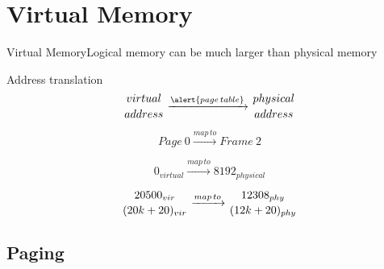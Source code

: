 \section{Virtual Memory}

\begin{frame}{Virtual Memory}{Logical memory can be much larger than physical memory}
  \begin{minipage}{.4\textwidth}
  \end{minipage}\hfill
  \begin{minipage}{.48\textwidth}
    \begin{iblock}{Address translation}
      $$\genfrac{}{}{0pt}{}{virtual}{address}
      \xrightarrow{\alert{page\,table}}
      \genfrac{}{}{0pt}{}{physical}{address}$$
      
      $$Page\ 0\xrightarrow{map\,to}Frame\ 2$$
      
      $$0_{virtual}\xrightarrow{map\,to}8192_{physical}$$
      
      $$\genfrac{}{}{0pt}{}{20500_{vir}}{(20k+20)_{vir}}
      \xrightarrow{map\,to} \genfrac{}{}{0pt}{}{12308_{phy}}{(12k+20)_{phy}}$$
    \end{iblock}
  \end{minipage}
\end{frame}


\subsection{Paging}

